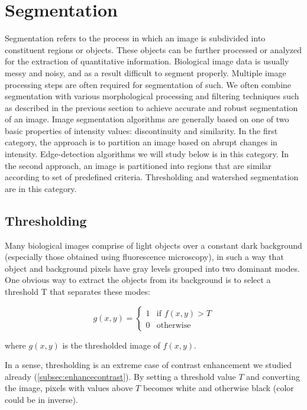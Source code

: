 
\section{Segmentation}
\label{sec:segmentation}

Segmentation refers to the process in which an image is subdivided into
constituent regions or objects. These objects can be further
processed or analyzed for the extraction of quantitative information.
Biological image data is usually messy and noisy, and as a result
difficult to segment properly. Multiple image processing steps are
often required for segmentation of such. We often combine segmentation
with various morphological processing and filtering techniques such as
described in the previous section to achieve accurate and robust
segmentation of an image.
Image segmentation algorithms are generally based on one of two basic
properties of intensity values: discontinuity and similarity. In the
first category, the approach is to partition an image based on abrupt
changes in intensity. Edge-detection algorithms we will study below is
in this category. In the second approach, an image is partitioned into
regions that are similar according to set of predefined criteria.
Thresholding and watershed segmentation are in this category.

\subsection{Thresholding}

Many biological images comprise of light objects over a constant dark
background (especially those obtained using fluorescence microscopy),
in such a way that object and background pixels have gray levels
grouped into two dominant modes. One obvious way to extract the objects
from its background is to select a threshold T that separates these
modes:

\begin{equation}
g(x,y)= 
\begin{cases}
1 & \text{if $f(x, y) > T$}\\
0 & \text{otherwise}
\end{cases}
\end{equation}

where $g(x,y)$ is the thresholded image of
$f(x,y)$.

In a sense, thresholding is an extreme case of contrast enhancement we
studied already (\ref{subsec:enhancecontrast}). By setting a threshold value $T$ and
converting the image, pixels with values above $T$ becomes white and
otherwise black (color could be in inverse). 

